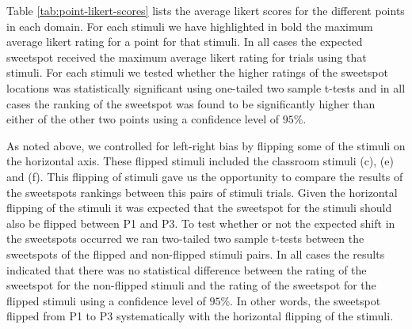 \documentclass[11pt,letterpaper]{article}
\begin{document}
Table \ref{tab:point-likert-scores} lists the average likert scores for the different points in each domain. For each stimuli we have highlighted in bold the maximum average likert rating for a point for that stimuli. In all cases the expected sweetspot received the maximum average likert rating for trials using that stimuli. For each stimuli we tested whether the higher ratings of the sweetspot locations was statistically significant using one-tailed two sample t-tests and in all cases the ranking of the sweetspot was found to be significantly higher than either of the other two points using a confidence level of $95\%$. 

As noted above, we controlled for left-right bias by flipping some of the stimuli on the horizontal axis. These flipped stimuli included the classroom stimuli (c), (e) and (f). This flipping of stimuli gave us the opportunity to compare the results of the sweetspots rankings between this pairs of stimuli trials. Given the horizontal flipping of the stimuli it was expected that the sweetspot for the stimuli should also be flipped between P1 and P3. To test whether or not the expected shift in the sweetspots occurred we ran two-tailed two sample t-tests between the sweetspots of the flipped and non-flipped stimuli pairs. In all cases the results indicated that there was no statistical difference between the rating of the sweetspot for the non-flipped stimuli and the rating of the sweetspot for the flipped stimuli using a confidence level of $95\%$. In other words, the sweetspot flipped from P1 to P3 systematically with the horizontal flipping of the stimuli. %
\end{document}

